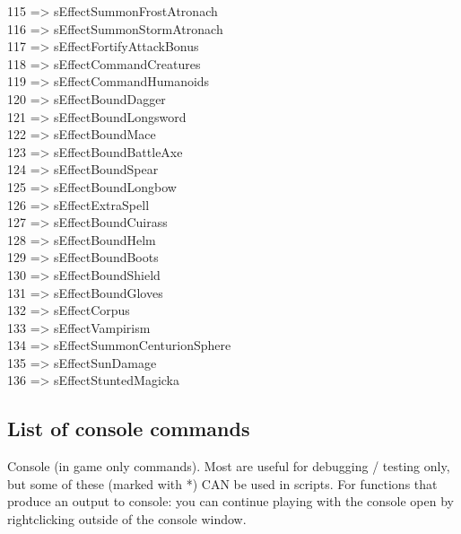 115 => sEffectSummonFrostAtronach\\
116 => sEffectSummonStormAtronach\\
117 => sEffectFortifyAttackBonus\\
118 => sEffectCommandCreatures\\
119 => sEffectCommandHumanoids\\
120 => sEffectBoundDagger\\
121 => sEffectBoundLongsword\\
122 => sEffectBoundMace\\
123 => sEffectBoundBattleAxe\\
124 => sEffectBoundSpear\\
125 => sEffectBoundLongbow\\
126 => sEffectExtraSpell\\
127 => sEffectBoundCuirass\\
128 => sEffectBoundHelm\\
129 => sEffectBoundBoots\\
130 => sEffectBoundShield\\
131 => sEffectBoundGloves\\
132 => sEffectCorpus\\
133 => sEffectVampirism\\
134 => sEffectSummonCenturionSphere\\
135 => sEffectSunDamage\\
136 => sEffectStuntedMagicka

\hypertarget{list-of-console-commands}{%
\subsection{\texorpdfstring{\hfill\break
List of console
commands}{ List of console commands}}\label{list-of-console-commands}}

Console (in game only commands). Most are useful for debugging / testing
only, but some of these (marked with *) CAN be used in scripts. For
functions that produce an output to console: you can continue playing
with the console open by rightclicking outside of the console window.


